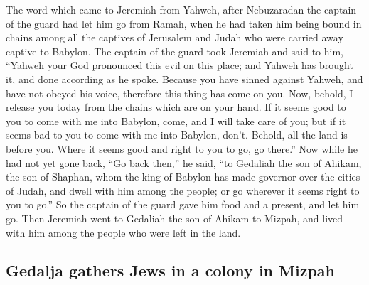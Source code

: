 \begin{paracol}{2}
\begin{otherlanguage}{english}
 The word which came to Jeremiah from Yahweh, after
Nebuzaradan the captain of the guard had let him go from Ramah, when he
had taken him being bound in chains among all the captives of Jerusalem
and Judah who were carried away captive to Babylon.  The
captain of the guard took Jeremiah and said to him, ``Yahweh your God
pronounced this evil on this place;  and Yahweh has
brought it, and done according as he spoke. Because you have sinned
against Yahweh, and have not obeyed his voice, therefore this thing has
come on you.  Now, behold, I release you today from the
chains which are on your hand. If it seems good to you to come with me
into Babylon, come, and I will take care of you; but if it seems bad to
you to come with me into Babylon, don't. Behold, all the land is before
you. Where it seems good and right to you to go, go there.''
 Now while he had not yet gone back, ``Go back then,'' he
said, ``to Gedaliah the son of Ahikam, the son of Shaphan, whom the king
of Babylon has made governor over the cities of Judah, and dwell with
him among the people; or go wherever it seems right to you to go.'' So
the captain of the guard gave him food and a present, and let him go.
 Then Jeremiah went to Gedaliah the son of Ahikam to
Mizpah, and lived with him among the people who were left in the land.

\hypertarget{gedalja-gathers-jews-in-a-colony-in-mizpah}{%
\subsection{Gedalja gathers Jews in a colony in
Mizpah}\label{gedalja-gathers-jews-in-a-colony-in-mizpah}}


\end{otherlanguage}
\end{paracol}
